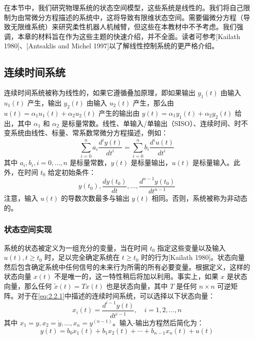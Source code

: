 \documentclass[UTF8,12pt,a4paper]{ctexart}
\theoremstyle{definition}
\begin{document}
在本节中，我们研究物理系统的状态空间模型，这些系统是线性的。我们将自己限制为由常微分方程描述的系统中，这将导致有限维状态空间。需要偏微分方程（导致无限维系统）来研究柔性机器人机械臂，但这些在本教材中不予考虑。我们强调，本章的材料旨在作为这些主题的快速介绍，并不全面。读者可参考[Kailath 1980]、[Antsaklis and Michel 1997]以了解线性控制系统的更严格介绍。

\subsection{连续时间系统}

连续时间系统被称为线性的，如果它遵循叠加原理，即如果输出 $y_1(t)$ 由输入 $u_1(t)$ 产生，输出 $y_2(t)$ 由输入 $u_2(t)$ 产生，那么由 $u(t)=\alpha_1 u_1(t)+\alpha_2 u_2(t)$ 产生的输出由 $y(t)=\alpha_1 y_1(t)+\alpha_2 y_2(t)$ 给出，其中 $\alpha_1$ 和 $\alpha_2$ 是标量常数。线性、单输入/单输出（SISO）、连续时间、时不变系统由线性、标量、常系数常微分方程描述，例如：
\begin{equation}\label{eq:2.2.1}
\sum_{i=0}^{n} a_i \frac{d^i y(t)}{dt^i} = \sum_{i=0}^{n} b_i \frac{d^i u(t)}{dt^i}
\end{equation}
其中 $a_i, b_i, i=0,\ldots,n$ 是标量常数，$y(t)$ 是标量输出，$u(t)$ 是标量输入。此外，在时间 $t_0$ 给定初始条件：
\begin{equation}
y(t_0), \frac{dy(t_0)}{dt}, \ldots, \frac{d^{n-1}y(t_0)}{dt^{n-1}}
\end{equation}
注意，输入 $u(t)$ 的导数次数最多与输出 $y(t)$ 相同。否则，系统被称为非动态的。

\subsubsection{状态空间实现}

系统的状态被定义为一组充分的变量，当在时间 $t_0$ 指定这些变量以及输入 $u(t), t \geq t_0$ 时，足以完全确定系统在 $t \geq t_0$ 时的行为[Kailath 1980]。状态向量然后包含确定系统中任何信号的未来行为所需的所有必要变量。根据定义，这样的状态向量 $x(t)$ 不是唯一的，这一特性稍后将加以利用。事实上，如果 $x$ 是状态向量，那么任何 $\tilde{x}(t)=Tx(t)$ 也是状态向量，其中 $T$ 是任何 $n \times n$ 可逆矩阵。对于在\eqref{eq:2.2.1}中描述的连续时间系统，可以选择以下状态向量：
\begin{equation}\label{eq:2.2.2}
x_i(t) = \frac{d^{i-1}y(t)}{dt^{i-1}}, \quad i=1,2,\ldots,n
\end{equation}
其中 $x_1=y, x_2=\dot{y}, \ldots, x_n=y^{(n-1)}$。输入-输出方程然后简化为：
\begin{equation}\label{eq:2.2.3}
y(t) = b_0 x_1(t) + b_1 x_2(t) + \cdots + b_{n-1} x_n(t) + u(t)
\end{equation}
\end{document}

